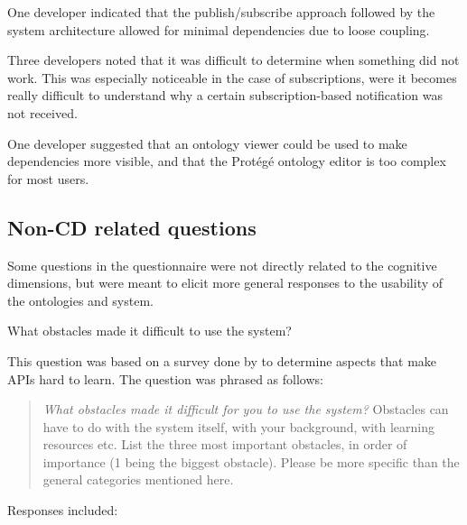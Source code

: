 One developer indicated that the publish/subscribe approach followed by the system architecture allowed for minimal dependencies due to loose coupling.

Three developers noted that it was difficult to determine when something did not work. This was especially noticeable in the case of subscriptions, were it becomes really difficult to understand why a certain subscription-based notification was not received.

One developer suggested that an ontology viewer could be used to make dependencies more visible, and that the Prot\'eg\'e ontology editor is too complex for most users.


\subsection{Non-CD related questions}

Some questions in the questionnaire were not directly related to the cognitive dimensions, but were meant to elicit more general responses to the usability of the ontologies and system.\\

\begin{cdquestion}
	What obstacles made it difficult to use the system?
\end{cdquestion}

This question was based on a survey done by \cite{Robillard2009} to determine aspects that make \acp{API} hard to learn. The question was phrased as follows:

\begin{quote}
\emph{What obstacles made it difficult for you to use the system?} Obstacles can have to do with the system itself, with your background, with learning resources etc. List the three most important obstacles, in order of importance (1 being the biggest obstacle). Please be more specific than the general categories mentioned here.
\end{quote}

Responses included:


